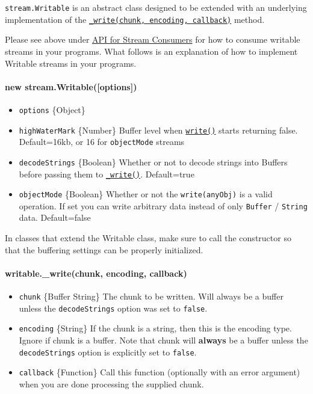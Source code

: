 \texttt{stream.Writable} is an abstract class designed to be extended
with an underlying implementation of the
\hyperref[streamux5fwritableux5fwriteux5fchunkux5fencodingux5fcallbackux5f1]{\texttt{\_write(chunk, encoding, callback)}}
method.

Please see above under
\hyperref[streamux5fapiux5fforux5fstreamux5fconsumers]{API for Stream
Consumers} for how to consume writable streams in your programs. What
follows is an explanation of how to implement Writable streams in your
programs.

\paragraph{new
stream.Writable({[}options{]})}\label{new-stream.writableoptions}

\begin{itemize}
\itemsep1pt\parskip0pt
\item
  \texttt{options} \{Object\}
\item
  \texttt{highWaterMark} \{Number\} Buffer level when
  \hyperref[streamux5fwritableux5fwriteux5fchunkux5fencodingux5fcallback]{\texttt{write()}}
  starts returning false. Default=16kb, or 16 for \texttt{objectMode}
  streams
\item
  \texttt{decodeStrings} \{Boolean\} Whether or not to decode strings
  into Buffers before passing them to
  \hyperref[streamux5fwritableux5fwriteux5fchunkux5fencodingux5fcallbackux5f1]{\texttt{\_write()}}.
  Default=true
\item
  \texttt{objectMode} \{Boolean\} Whether or not the
  \texttt{write(anyObj)} is a valid operation. If set you can write
  arbitrary data instead of only \texttt{Buffer} / \texttt{String} data.
  Default=false
\end{itemize}

In classes that extend the Writable class, make sure to call the
constructor so that the buffering settings can be properly initialized.

\paragraph{writable.\_write(chunk, encoding,
callback)}\label{writable.ux5fwritechunk-encoding-callback}

\begin{itemize}
\itemsep1pt\parskip0pt
\item
  \texttt{chunk} \{Buffer \textbar{} String\} The chunk to be written.
  Will always be a buffer unless the \texttt{decodeStrings} option was
  set to \texttt{false}.
\item
  \texttt{encoding} \{String\} If the chunk is a string, then this is
  the encoding type. Ignore if chunk is a buffer. Note that chunk will
  \textbf{always} be a buffer unless the \texttt{decodeStrings} option
  is explicitly set to \texttt{false}.
\item
  \texttt{callback} \{Function\} Call this function (optionally with an
  error argument) when you are done processing the supplied chunk.
\end{itemize}

